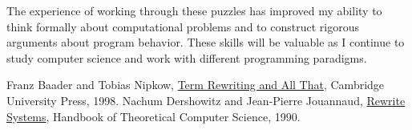 \documentclass{article}
\theoremstyle{plain}
\theoremstyle{definition}
\theoremstyle{remark}
\begin{document}
The experience of working through these puzzles has improved my ability to think formally about computational problems and to construct rigorous arguments about program behavior. These skills will be valuable as I continue to study computer science and work with different programming paradigms.

\begin{thebibliography}{99}
 Franz Baader and Tobias Nipkow, \href{https://en.wikipedia.org/wiki/Abstract_rewriting_system}{Term Rewriting and All That}, Cambridge University Press, 1998.
 Nachum Dershowitz and Jean-Pierre Jouannaud, \href{https://en.wikipedia.org/wiki/Term_rewriting}{Rewrite Systems}, Handbook of Theoretical Computer Science, 1990.
\end{thebibliography}
\end{document}
